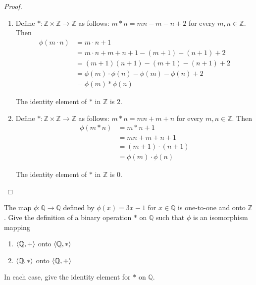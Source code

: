 \begin{proof}
    \begin{enumerate}[label={\textbf{\alph*}},itemsep=0pt,topsep=0pt]
        \item Define $*: \mathbb{Z}\times\mathbb{Z}\to\mathbb{Z}$ as follows: $m * n = mn - m - n + 2$ for every $m, n\in\mathbb{Z}$. Then
              \begin{align*}
                  \phi(m\cdot n) & = m\cdot n + 1                                 \\
                                 & = m\cdot n + m + n + 1 - (m + 1) - (n + 1) + 2 \\
                                 & = (m + 1)(n + 1) - (m + 1) - (n + 1) + 2       \\
                                 & = \phi(m)\cdot\phi(n) - \phi(m) - \phi(n) + 2  \\
                                 & = \phi(m) * \phi(n)
              \end{align*}

              The identity element of $*$ in $\mathbb{Z}$ is $2$.
        \item Define $*: \mathbb{Z}\times\mathbb{Z}\to\mathbb{Z}$ as follows: $m * n = mn + m + n$ for every $m, n\in\mathbb{Z}$. Then
              \begin{align*}
                  \phi(m * n) & = m * n + 1            \\
                              & = mn + m + n + 1       \\
                              & = (m + 1)\cdot (n + 1) \\
                              & = \phi(m)\cdot\phi(n)
              \end{align*}

              The identity element of $*$ in $\mathbb{Z}$ is $0$.
    \end{enumerate}
\end{proof}

\begin{exercise}
    The map $\phi: \mathbb{Q} \to \mathbb{Q}$ defined by $\phi(x) = 3x - 1$ for $x\in\mathbb{Q}$ is one-to-one and onto $\mathbb{Z}$. Give the definition of a binary operation $*$ on $\mathbb{Q}$ such that $\phi$ is an isomorphism mapping
    \begin{enumerate}[label={\textbf{\alph*}},itemsep=0pt,topsep=0pt]
        \item $\left\langle{\mathbb{Q}, +}\right\rangle$ onto $\left\langle{\mathbb{Q}, *}\right\rangle$
        \item $\left\langle{\mathbb{Q}, *}\right\rangle$ onto $\left\langle{\mathbb{Q}, +}\right\rangle$
    \end{enumerate}

    In each case, give the identity element for $*$ on $\mathbb{Q}$.
\end{exercise}

